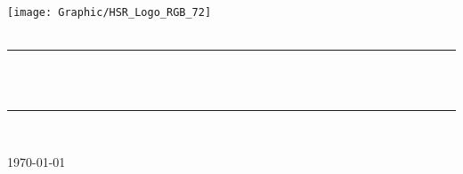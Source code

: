 
\begin{titlepage}


\vspace*{\fill}

\newcommand{\HRule}{\color{sectioncolor}\rule{\linewidth}{0.5mm}} %

\center

\texttt{[image: Graphic/HSR\_Logo\_RGB\_72]}\\[1cm] 


\textsc{\huge \SUBJECT}\\[1cm]

{\HRule} \\[0.7cm]
{ \Huge \bfseries \textcolor{sectioncolor}{\TITLE}}\\[0.4cm]
{\HRule} \\[1.1cm]

\Large \AUTHOR

\Large \today


\vfill %

\end{titlepage} 



